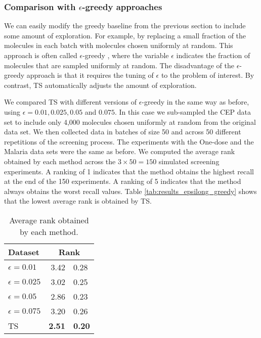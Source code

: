 \subsubsection{Comparison with $\epsilon$-greedy approaches}

We can easily modify the greedy baseline from the previous section to include some amount of exploration. For example, by replacing a small fraction of the molecules in each batch with molecules chosen uniformly at random. This approach is often called $\epsilon$-greedy \cite{watkins1989learning}, where the variable $\epsilon$ indicates the fraction of molecules that are sampled uniformly at random. The disadvantage of the $\epsilon$-greedy approach is that it requires the tuning of $\epsilon$ to the problem of interest. By contrast, TS automatically adjusts the amount of exploration. 

We compared TS with different versions of $\epsilon$-greedy in the same way as before, using $\epsilon = 0.01, 0.025, 0.05$ and $0.075$. In this case we sub-sampled the CEP data set to include only 4,000 molecules chosen uniformly at random from the original data set. We then collected data in batches of size 50 and across 50 different repetitions of the screening process. The experiments with the One-dose and the Malaria data sets were the same as before.  We computed the average rank obtained by each method across the $3\times 50 = 150$ simulated screening experiments. A ranking of 1 indicates that the method obtains the highest recall at the end of the 150 experiments. A ranking of 5 indicates that the method always obtains the worst recall values. Table \ref{tab:results_epsilong_greedy} shows that the lowest average rank is obtained by TS. 

\begin{table}
\centering
\caption{Average rank obtained by each method.}\label{tab:results_epsilon_greedy}
\begin{tabular}{lr@{$\pm$}l}
\hline
\bf{Dataset}& \multicolumn{2}{c}{\bf{Rank}}\\
\hline
$\epsilon = 0.01$ & 3.42 & 0.28 \\
$\epsilon = 0.025$ & 3.02 & 0.25 \\
$\epsilon = 0.05$ & 2.86 & 0.23 \\
$\epsilon = 0.075$ & 3.20 & 0.26 \\
TS & \bf{ 2.51 }&\bf{ 0.20 } \\
\hline
\end{tabular}
\end{table}